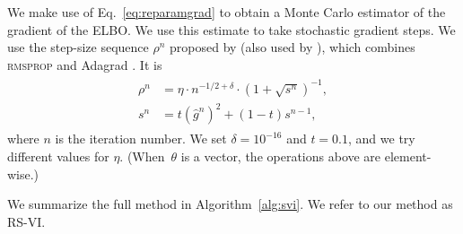 We make use of Eq.~\ref{eq:reparamgrad} to obtain a Monte Carlo estimator of the gradient of the \gls{ELBO}. We use this estimate to take stochastic gradient steps. We use the step-size sequence $\rho^n$ proposed by \citet{Kucukelbir2016} (also used by \citet{RuizTB2016}), which combines \textsc{rmsprop} \citep{Tieleman2012} and Adagrad \citep{Duchi2011}. It is
\begin{align}
\begin{split}
\rho^n &= \eta \cdot n^{-1/2 + \delta} \cdot \left(1 + \sqrt{s^n}\right)^{-1},\\
s^n &= t \left( \hat{g}^n \right)^2 + (1-t) s^{n-1},
\label{eq:stepsize}
\end{split}
\end{align}
where $n$ is the iteration number. We set $\delta = 10^{-16}$ and $t=0.1$, and we try different values for $\eta$. (When~$\theta$ is a vector, the operations above are element-wise.)

We summarize the full method in Algorithm~\ref{alg:svi}. We refer to our method as \gls{RS-VI}. %
